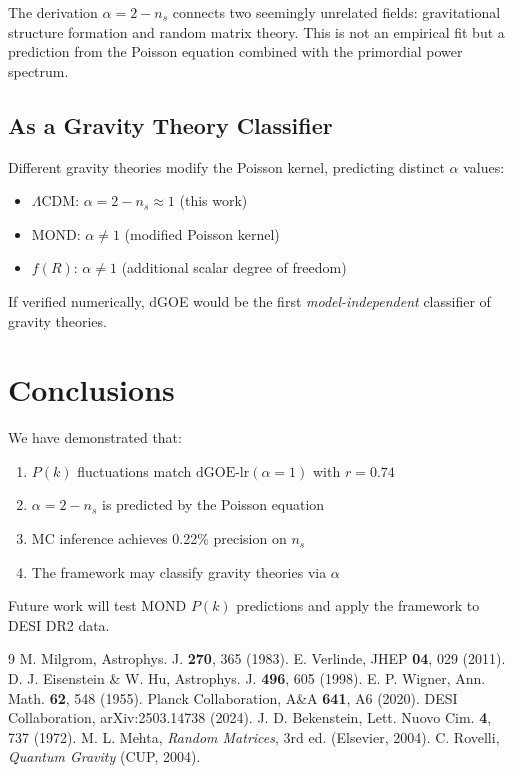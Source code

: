 \documentclass[12pt,a4paper]{article}
\begin{document}
The derivation $\alpha = 2 - n_s$ connects two seemingly unrelated fields: gravitational structure formation and random matrix theory. This is not an empirical fit but a prediction from the Poisson equation combined with the primordial power spectrum.

\subsection{As a Gravity Theory Classifier}

Different gravity theories modify the Poisson kernel, predicting distinct $\alpha$ values:
\begin{itemize}
\item $\Lambda$CDM: $\alpha = 2 - n_s \approx 1$ (this work)
\item MOND: $\alpha \neq 1$ (modified Poisson kernel)
\item $f(R)$: $\alpha \neq 1$ (additional scalar degree of freedom)
\end{itemize}

If verified numerically, dGOE would be the first \textit{model-independent} classifier of gravity theories.

\section{Conclusions}

We have demonstrated that:
\begin{enumerate}
\item $P(k)$ fluctuations match $\mathrm{dGOE\text{-}lr}(\alpha=1)$ with $r = 0.74$
\item $\alpha = 2 - n_s$ is predicted by the Poisson equation
\item MC inference achieves 0.22\% precision on $n_s$
\item The framework may classify gravity theories via $\alpha$
\end{enumerate}

Future work will test MOND $P(k)$ predictions and apply the framework to DESI DR2 data.

\begin{thebibliography}{9}
 M. Milgrom, Astrophys. J. \textbf{270}, 365 (1983).
 E. Verlinde, JHEP \textbf{04}, 029 (2011).
 D. J. Eisenstein \& W. Hu, Astrophys. J. \textbf{496}, 605 (1998).
 E. P. Wigner, Ann. Math. \textbf{62}, 548 (1955).
 Planck Collaboration, A\&A \textbf{641}, A6 (2020).
 DESI Collaboration, arXiv:2503.14738 (2024).
 J. D. Bekenstein, Lett. Nuovo Cim. \textbf{4}, 737 (1972).
 M. L. Mehta, \textit{Random Matrices}, 3rd ed. (Elsevier, 2004).
 C. Rovelli, \textit{Quantum Gravity} (CUP, 2004).
\end{thebibliography}
\end{document}
